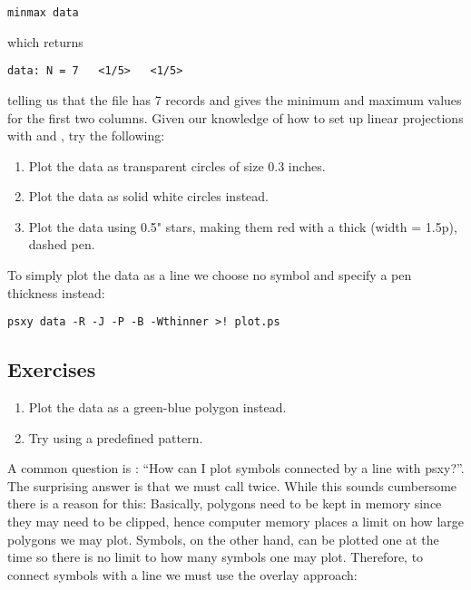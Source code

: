 \documentclass{report}
\begin{document}
\begin{verbatim}
minmax data
\end{verbatim} 

\noindent
which returns

\begin{verbatim}
data: N = 7   <1/5>   <1/5>
\end{verbatim} 

\noindent
telling us that the file  has 7 records and gives the
minimum and maximum values for the first two columns.  Given our
knowledge of how to set up linear projections with  and ,
try the following:

\begin{enumerate}

\item Plot the data as transparent circles of size 0.3 inches.

\item Plot the data as solid white circles instead.

\item Plot the data using 0.5" stars, making them red with a thick (width = 1.5p),
dashed pen.

\end{enumerate}

To simply plot the data as a line we choose no symbol and specify a pen thickness instead:

\begin{verbatim} 
psxy data -R -J -P -B -Wthinner >! plot.ps
\end{verbatim} 

\subsection{Exercises}

\begin{enumerate}

\item Plot the data as a green-blue polygon instead.

\item Try using a predefined pattern.

\end{enumerate}

A common question is : ``How can I plot symbols connected by a line
with psxy?''.  The surprising answer is that we must call  twice.
While this sounds cumbersome there is a reason for this:  Basically,
polygons need to be kept in memory since they may need to be clipped,
hence computer memory places a limit on how large polygons we may plot.
Symbols, on the other hand, can be plotted one at the time so there
is no limit to how many symbols one may plot.  Therefore, to connect
symbols with a line we must use the overlay approach:
\end{document}
